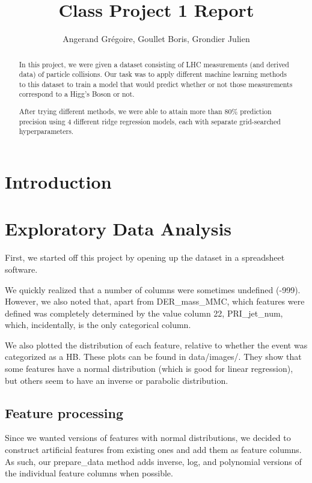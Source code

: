 \documentclass[10pt,conference,compsocconf]{IEEEtran}
\begin{document}
\title{Class Project 1 Report}

\author{
  Angerand Gr\'egoire, Goullet Boris, Grondier Julien 
}

\maketitle

\begin{abstract}
In this project, we were given a dataset consisting of LHC measurements (and derived data) of particle collisions. Our task was to apply different machine learning methods to this dataset to train a model that would predict whether or not those measurements correspond to a Higg's Boson or not.

After trying different methods, we were able to attain more than 80\% prediction precision using 4 different ridge regression models, each with separate grid-searched hyperparameters.
\end{abstract}

\section{Introduction}

\section{Exploratory Data Analysis}
First, we started off this project by opening up the dataset in a spreadsheet software.

We quickly realized that a number of columns were sometimes undefined (-999). However, we also noted that, apart from DER\_mass\_MMC, which features were defined was completely determined by the value column 22, PRI\_jet\_num, which, incidentally, is the only categorical column. %

We also plotted the distribution of each feature, relative to whether the event was categorized as a HB. These plots can be found in data/images/. They show that some features have a normal distribution (which is good for linear regression), but others seem to have an inverse %
or parabolic distribution.

\subsection*{Feature processing}
Since we wanted versions of features with normal distributions, we decided to construct artificial features from existing ones and add them as feature columns. As such, our prepare\_data method adds inverse, log, and polynomial versions of the individual feature columns when possible.
\end{document}
